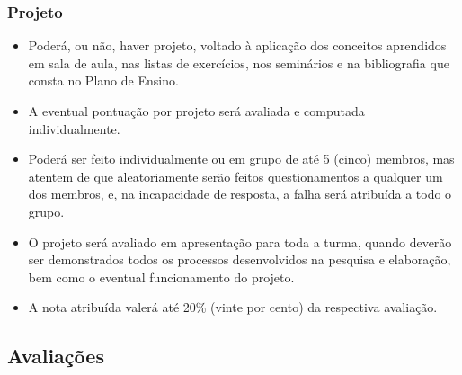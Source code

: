 \begin{frame}[t]\frametitle{Projeto}
  
  \begin{itemize}
    \justifying{}
    \setlength\itemsep{1em}
    \item Poderá, ou não, haver projeto, voltado à aplicação dos conceitos aprendidos em sala de aula, nas listas de exercícios, nos seminários e na bibliografia que consta no Plano de Ensino.
    \item A eventual pontuação por projeto será avaliada e computada individualmente.
    \item Poderá ser feito individualmente ou em grupo de até 5 (cinco) membros, mas atentem de que aleatoriamente serão feitos questionamentos a qualquer um dos membros, e, na incapacidade de resposta, a falha será atribuída a todo o grupo.
    \item O projeto será avaliado em apresentação para toda a turma, quando deverão ser demonstrados todos os processos desenvolvidos na pesquisa e elaboração, bem como o eventual funcionamento do projeto.
    \item A nota atribuída valerá até 20\% (vinte por cento) da respectiva avaliação.
  \end{itemize}
  
\end{frame}



\subsection[Avaliações]{Avaliações}\label{subsec:planejamento-avaliacoes}



